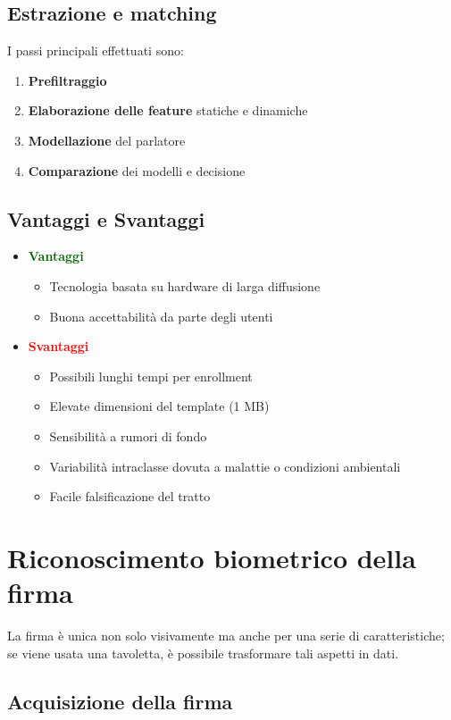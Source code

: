 \documentclass{report}
\begin{document}
\section{Estrazione e matching}
I passi principali effettuati sono:
\begin{enumerate}
    \item \textbf{Prefiltraggio}
    \item \textbf{Elaborazione delle feature} statiche e dinamiche 
    \item \textbf{Modellazione} del parlatore 
    \item \textbf{Comparazione} dei modelli e decisione
\end{enumerate}

\section{Vantaggi e Svantaggi}
\begin{itemize}
    \item \textcolor{darkgreen}{\textbf{Vantaggi}}
    \begin{itemize}
        \item Tecnologia basata su hardware di larga diffusione 
        \item Buona accettabilità da parte degli utenti 
    \end{itemize}
    \item \textcolor{red}{\textbf{Svantaggi}}
    \begin{itemize}
        \item Possibili lunghi tempi per enrollment
        \item Elevate dimensioni del template (1 MB)
        \item Sensibilità a rumori di fondo 
        \item Variabilità intraclasse dovuta a malattie o condizioni ambientali 
        \item Facile falsificazione del tratto
    \end{itemize}
\end{itemize}

\chapter{Riconoscimento biometrico della firma}
La firma è unica non solo visivamente ma anche per una serie di caratteristiche;
se viene usata una tavoletta, è possibile trasformare tali aspetti in dati.

\section{Acquisizione della firma}
\end{document}
